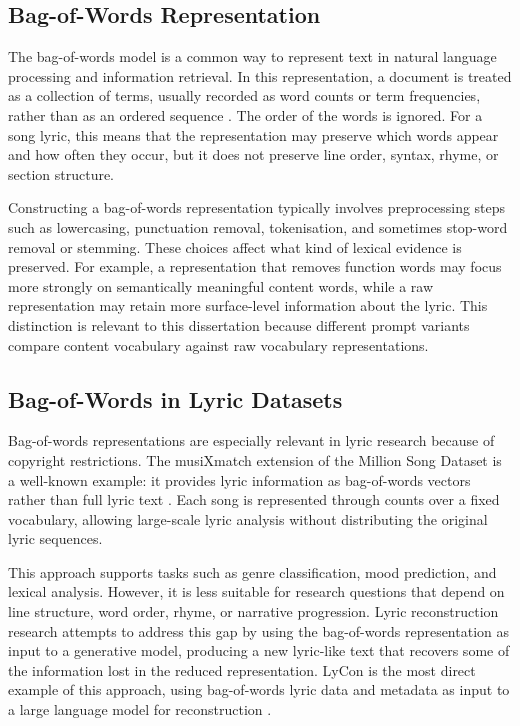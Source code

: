 \subsection{Bag-of-Words Representation}

The bag-of-words model is a common way to represent text in natural language processing and information retrieval. In this representation, a document is treated as a collection of terms, usually recorded as word counts or term frequencies, rather than as an ordered sequence \cite{manning2008ir}. The order of the words is ignored. For a song lyric, this means that the representation may preserve which words appear and how often they occur, but it does not preserve line order, syntax, rhyme, or section structure.

Constructing a bag-of-words representation typically involves preprocessing steps such as lowercasing, punctuation removal, tokenisation, and sometimes stop-word removal or stemming. These choices affect what kind of lexical evidence is preserved. For example, a representation that removes function words may focus more strongly on semantically meaningful content words, while a raw representation may retain more surface-level information about the lyric. This distinction is relevant to this dissertation because different prompt variants compare content vocabulary against raw vocabulary representations.

\subsection{Bag-of-Words in Lyric Datasets}

Bag-of-words representations are especially relevant in lyric research because of copyright restrictions. The musiXmatch extension of the Million Song Dataset is a well-known example: it provides lyric information as bag-of-words vectors rather than full lyric text \cite{bertinmahieux2011million,musixmatch2011dataset}. Each song is represented through counts over a fixed vocabulary, allowing large-scale lyric analysis without distributing the original lyric sequences.

This approach supports tasks such as genre classification, mood prediction, and lexical analysis. However, it is less suitable for research questions that depend on line structure, word order, rhyme, or narrative progression. Lyric reconstruction research attempts to address this gap by using the bag-of-words representation as input to a generative model, producing a new lyric-like text that recovers some of the information lost in the reduced representation. LyCon is the most direct example of this approach, using bag-of-words lyric data and metadata as input to a large language model for reconstruction \cite{kim2024lycon}.

